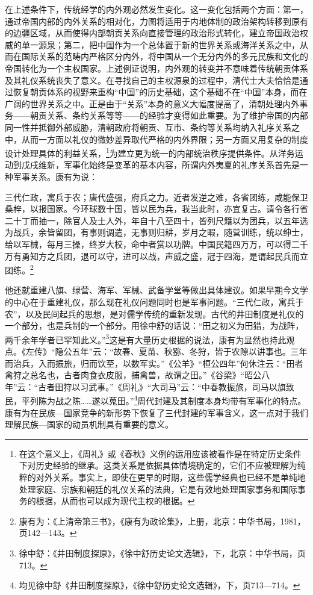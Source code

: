 \documentclass[a4paper, 12pt, openright]{ctexbook}
\renewenvironment{quote}
  {\list{}{\rightmargin2\ccwd \leftmargin2\ccwd \itemindent=2\ccwd \listparindent=2\ccwd}%
   \item\relax\small\kaishu\color{black}}
  {\endlist}
\begin{document}
在上述条件下，传统经学的内外观必然发生变化。这一变化包括两个方面：第一，通过帝国内部的内外关系的相对化，力图将适用于内地体制的政治架构转移到原有的边疆区域，从而使得内部朝贡关系向直接管理的政治形式转化，建立帝国政治权威的单一源泉；第二，把中国作为一个总体置于新的世界关系或海洋关系之中，从而在国际关系的范畴内严格区分内外，将中国从一个无分内外的多元民族和文化的帝国转化为一个主权国家。上述例证说明，内外观的转变并不意味着传统朝贡体系及其礼仪系统丧失了意义。在寻找自己的主权源泉的过程中，清代士大夫恰恰是通过恢复朝贡体系的视野来重构“中国”的历史基础，这个基础不在“中国”本身，而在广阔的世界关系之中。正是由于“关系”本身的意义大幅度提高了，清朝处理内外事务——朝贡关系、条约关系等等——的经验才变得如此重要。为了维护帝国的内部同一性并抵御外部威胁，清朝政府将朝贡、互市、条约等关系均纳入礼序关系之中，从而一方面以礼仪的微妙差异取代严格的内外界限；另一方面又用复杂的制度设计处理具体的利益关系，\footnote{在这个意义上，《周礼》或《春秋》义例的运用应该被看作是在特定历史条件下对历史经验的继承。这类关系是依据具体情境确定的，它们不应被理解为纯粹的对外关系。事实上，即使在更早的时期，这些儒学经典也已经不是单纯地处理家庭、宗族和朝廷的礼仪关系的法典，它是有效地处理国家事务和国际事务的根据，从而也可以成为现代主权的根据。}为建立更为统一的内部统治秩序提供条件。从洋务运动到戊戌维新，军事化始终是变革的基本内容，所谓内外夷夏的礼序关系首先是一种军事关系。康有为说：

\begin{quote}
三代仁政，寓兵于农；唐代盛强，府兵之力。近者发逆之难，各省团练，咸能保卫桑梓，以报国家。今环球数十国，皆以民为兵，我当此时，亦宜复古。请令各行省二十丁而抽一，除官人及士人外，年自十八至四十，皆列尺籍以为团兵，以五年选为战兵，余皆留团，有事则调遣，无事则归耕，岁月之暇，随营训练，统以绅士，给以军械，每月三操，终岁大校，命中者赏以功牌。中国民籍四万万，可以得二千万有勇知方之兵团，退可以守，进可以战，声威之盛，冠于四海，是谓起民兵而立团练。\footnote{康有为：《上清帝第三书》，《康有为政论集》，上册，北京：中华书局，1981，页142—143。}
\end{quote}

他还就重建八旗、绿营、海军、军械、武备学堂等做出具体建议。如果早期今文学的中心在于重建礼仪，那么现在礼仪问题同时也是军事问题。“三代仁政，寓兵于农”，以及民间起兵的思想，是对儒学传统的重新发现。古代的井田制度是礼仪的一个部分，也是兵制的一个部分。用徐中舒的话说：“田之初义为田猎，为战阵，两千余年学者已罕知此义。”\footnote{徐中舒：《井田制度探原》，《徐中舒历史论文选辑》，下，北京：中华书局，页713。}这是有大量历史根据的说法，康有为显然也持此观点。《左传》“隐公五年”云：“故春、夏苗、秋猕、冬狩，皆于农隙以讲事也。三年而治兵，入而振旅，归而饮至，以数军实。”《公羊》“桓公四年”何休注云：“田者禽狩之总名也，古者肉食衣皮服，捕禽兽，故谓之田。”《谷梁》“昭公八年”云：“古者田狩以习武事。”《周礼》“大司马”云：“中春教振旅，司马以旗致民，平列陈为战之陈……遂以蒐田。”\footnote{均见徐中舒《井田制度探原》，《徐中舒历史论文选辑》，下，页713—714。}周代封建及其制度本身均带有军事化的特点。康有为在民族—国家竞争的新形势下恢复了三代封建的军事含义，这一点对于我们理解民族—国家的动员机制具有重要的意义。
\end{document}
